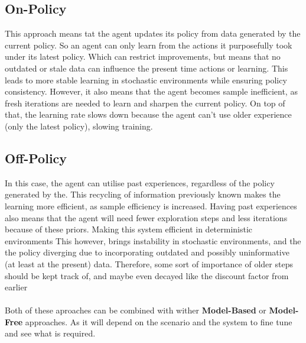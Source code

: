   \subsection{On-Policy}
  This approach means tat the agent updates its policy from data generated by the current policy. So an agent can only learn from the actions it purposefully took under its latest policy. Which can restrict improvements, but means that no outdated or stale data can influence the present time actions or learning.
  This leads to more stable learning in stochastic environments  while ensuring policy consistency.
  However, it also means that the agent becomes sample inefficient, as fresh iterations are needed to learn and sharpen the current policy. On top of that, the learning rate slows down because the agent can't use older experience (only the latest policy), slowing training.


  \subsection{Off-Policy}
  In this case, the agent can utilise past experiences, regardless of the policy generated by the. This recycling of information previously known makes the learning more efficient, as sample efficiency is increased.
  Having past experiences also means that the agent will need fewer exploration steps and less iterations because of these priors. Making this system efficient in deterministic environments 
  This however, brings instability in stochastic environments, and the the policy diverging due to incorporating outdated and possibly uninformative (at least at the present) data. Therefore, some sort of importance of older steps should be kept track of, and maybe even decayed like the discount factor from earlier 
  \\\\
  Both of these aproaches can be combined with wither \textbf{Model-Based} or \textbf{Model-Free} approaches. As it will depend on the scenario and the system to fine tune and see what is required.
